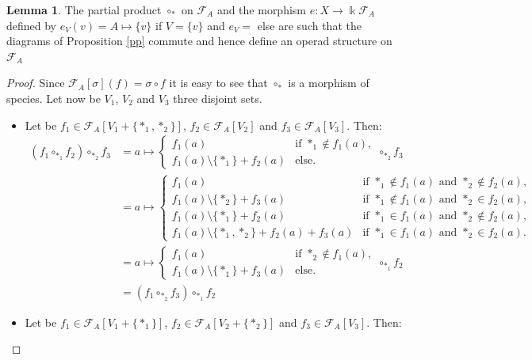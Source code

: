 \documentclass[a4paper]{article}
\theoremstyle{definition}
\newtheorem{lemma}[definition]{Lemma}
\begin{document}
\begin{lemma}
\label{opfunc}
The partial product $\circ_{\ast}$ on $\mathcal{F}_A$ and the morphism $e:X \rightarrow \Bbbk \mathcal{F}_A$ defined by $e_{V}(v) = A\mapsto\{v\}$ if $V=\{v\}$ and $e_V = $ else are such that the diagrams of Proposition \ref{pp} commute and hence define an operad structure on $\mathcal{F}_A$
\end{lemma}

\begin{proof}
Since $\mathcal{F}_A[\sigma](f) = \sigma\circ f$ it is easy to see that $\circ_{\ast}$ is a morphism of species. Let now be $V_1$, $V_2$ and $V_3$ three disjoint sets.
\begin{itemize}
\item Let be $f_1\in\mathcal{F}_A[V_1+\{\ast_1,\ast_2\}]$, $f_2\in \mathcal{F}_A[V_2]$ and $f_3\in \mathcal{F}_A[V_3]$. Then:
\begin{align*}
(f_1\circ_{\ast_1} f_2)\circ_{\ast_2} f_3 &= a\mapsto\left\{\begin{array}{cl}
f_1(a)  & \text{if $\ast_1\not\in f_1(a)$},    \\ 
f_1(a)\setminus\{\ast_1\} + f_2(a)  & \text{else.}\end{array}\right. \circ_{\ast_2} f_3 \\
&= a\mapsto\left\{\begin{array}{cl}
f_1(a)  & \text{if $\ast_1\not\in f_1(a)$ and $\ast_2\not\in f_2(a)$},    \\
f_1(a)\setminus\{\ast_2\} + f_3(a)  & \text{if $\ast_1\not\in f_1(a)$ and $\ast_2\in f_2(a)$},    \\ 
f_1(a)\setminus\{\ast_1\} + f_2(a)  & \text{if $\ast_1\in f_1(a)$ and $\ast_2\not\in f_2(a)$},    \\ 
f_1(a)\setminus\{\ast_1,\ast_2\} + f_2(a) + f_3(a)  & \text{if $\ast_1\in f_1(a)$ and $\ast_2\in f_2(a)$}.\end{array}\right. \\
&= a\mapsto\left\{\begin{array}{cl}
f_1(a)  & \text{if $\ast_2\not\in f_1(a)$},    \\ 
f_1(a)\setminus\{\ast_1\} + f_3(a)  & \text{else.}\end{array}\right. \circ_{\ast_1} f_2 \\
&= (f_1\circ_{\ast_2} f_3)\circ_{\ast_1} f_2
\end{align*}
\item Let be $f_1\in\mathcal{F}_A[V_1+\{\ast_1\}]$, $f_2\in \mathcal{F}_A[V_2+\{\ast_2\}]$ and $f_3\in \mathcal{F}_A[V_3]$. Then:

\end{itemize}
\end{proof}
\end{document}
